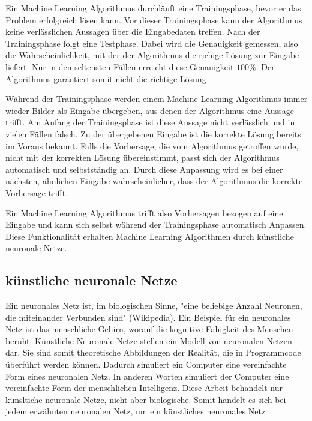 Ein Machine Learning Algorithmus durchläuft eine Trainingsphase, bevor er das
Problem erfolgreich lösen kann. Vor dieser Trainingsphase kann der Algorithmus
keine verlässlichen Aussagen über die Eingabedaten treffen. Nach der
Trainingsphase folgt eine Testphase. Dabei wird die Genauigkeit gemessen, also
die Wahrscheinlichkeit, mit der der Algorithmus die richige Lösung zur Eingabe
liefert. Nur in den seltensten Fällen erreicht diese Genauigkeit $100\%$. Der
Algorithmus garantiert somit nicht die richtige Lösung

Während der Trainingsphase werden einem Machine Learning Algorithmus immer
wieder Bilder als Eingabe übergeben, aus denen der Algorithmus eine Aussage
trifft. Am Anfang der Trainingsphase ist diese Aussage nicht verlässlich und in
vielen Fällen falsch. Zu der übergebenen Eingabe ist die korrekte Lösung bereits
im Voraus bekannt. Falls die Vorhersage, die vom Algorithmus getroffen wurde,
nicht mit der korrekten Lösung übereinstimmt, passt sich der Algorithmus
automatisch und selbstständig an. Durch diese Anpassung wird es bei einer
nächsten, ähnlichen Eingabe wahrscheinlicher, dass der Algorithmus die korrekte
Vorhersage trifft. 

Ein Machine Learning Algorithmus trifft also Vorhersagen bezogen auf eine
Eingabe und kann sich selbst während der Trainingsphase automatisch Anpassen.
Diese Funktionalität erhalten Machine Learning Algorithmen durch künstliche
neuronale Netze.

\subsection*{künstliche neuronale Netze}

Ein neuronales Netz ist, im biologischen Sinne, "eine beliebige Anzahl Neuronen,
die miteinander Verbunden sind" (Wikipedia). Ein Beispiel für ein neuronales
Netz ist das menschliche Gehirn, worauf die kognitive Fähigkeit des Menschen
beruht. Künstliche Neuronale Netze stellen ein Modell von neuronalen Netzen dar.
Sie sind somit theoretische Abbildungen der Realität, die in Programmcode
überführt werden können. Dadurch simuliert ein Computer eine vereinfachte Form
eines neuronalen Netz. In anderen Worten simuliert der Computer eine
vereinfachte Form der menschlichen Intelligenz. Diese Arbeit behandelt nur
künsltiche neuronale Netze, nicht aber biologische. Somit handelt es sich bei
jedem erwähnten neuronalen Netz, um ein künstliches neuronales Netz 

